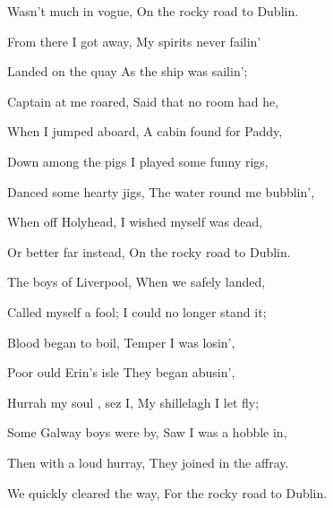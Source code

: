 Wasn't much in vogue, On the rocky road to Dublin.

\bigskip

From there I got away, My spirits never failin'

Landed on the quay As the ship was sailin';

Captain at me roared, Said that no room had he,

When I jumped aboard, A cabin found for Paddy,

Down among the pigs I played some funny rigs,

Danced some hearty jigs, The water round me bubblin',

When off Holyhead, I wished myself was dead,

Or better far instead, On the rocky road to Dublin.

\bigskip

The boys of Liverpool, When we safely landed,

Called myself a fool; I could no longer stand it;

Blood began to boil, Temper I was losin',

Poor ould Erin's isle They began abusin',

\og Hurrah my soul \fg , sez I, My shillelagh I let fly;

Some Galway boys were by, Saw I was a hobble in,

Then with a loud hurray, They joined in the affray.

We quickly cleared the way, For the rocky road to Dublin.




